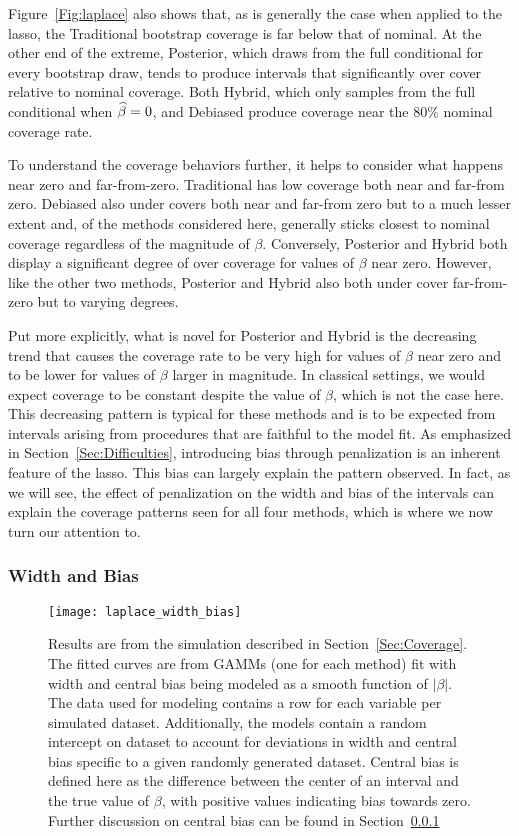 Figure~\ref{Fig:laplace} also shows that, as is generally the case when applied to the lasso, the Traditional bootstrap coverage is far below that of nominal. At the other end of the extreme, Posterior, which draws from the full conditional for every bootstrap draw, tends to produce intervals that significantly over cover relative to nominal coverage. Both Hybrid, which only samples from the full conditional when $\widehat{\beta} = 0$, and Debiased produce coverage near the $80\%$ nominal coverage rate.


To understand the coverage behaviors further, it helps to consider what happens near zero and far-from-zero. Traditional has low coverage both near and far-from zero. Debiased also under covers both near and far-from zero but to a much lesser extent and, of the methods considered here, generally sticks closest to nominal coverage regardless of the magnitude of $\beta$. Conversely, Posterior and Hybrid both display a significant degree of over coverage for values of $\beta$ near zero. However, like the other two methods, Posterior and Hybrid also both under cover far-from-zero but to varying degrees. 

Put more explicitly, what is novel for Posterior and Hybrid is the decreasing trend that causes the coverage rate to be very high for values of $\beta$ near zero and to be lower for values of $\beta$ larger in magnitude. In classical settings, we would expect coverage to be constant despite the value of $\beta$, which is not the case here. This decreasing pattern is typical for these methods and is to be expected from intervals arising from procedures that are faithful to the model fit. As emphasized in Section~\ref{Sec:Difficulties}, introducing bias through penalization is an inherent feature of the lasso. This bias can largely explain the pattern observed. In fact, as we will see, the effect of penalization on the width and bias of the intervals can explain the coverage patterns seen for all four methods, which is where we now turn our attention to.

\subsubsection{Width and Bias}\label{Sec:Width and Bias}

\begin{figure}[hbtp]
  \texttt{[image: laplace\_width\_bias]}
  \caption{\label{Fig:laplace_width_bias} Results are from the simulation described in Section~\ref{Sec:Coverage}. The fitted curves are from GAMMs (one for each method) fit with width and central bias being modeled as a smooth function of $|\beta|$. The data used for modeling contains a row for each variable per simulated dataset. Additionally, the models contain a random intercept on dataset to account for deviations in width and central bias specific to a given randomly generated dataset. Central bias is defined here as the difference between the center of an interval and the true value of $\beta$, with positive values indicating bias towards zero. Further discussion on central bias can be found in Section~\ref{Sec:Width and Bias}}
\end{figure}

